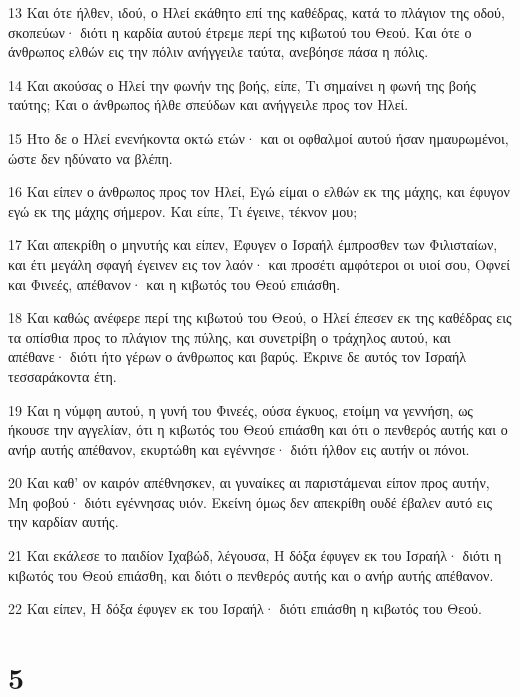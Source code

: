 \par 13 Και ότε ήλθεν, ιδού, ο Ηλεί εκάθητο επί της καθέδρας, κατά το πλάγιον της οδού, σκοπεύων· διότι η καρδία αυτού έτρεμε περί της κιβωτού του Θεού. Και ότε ο άνθρωπος ελθών εις την πόλιν ανήγγειλε ταύτα, ανεβόησε πάσα η πόλις.
\par 14 Και ακούσας ο Ηλεί την φωνήν της βοής, είπε, Τι σημαίνει η φωνή της βοής ταύτης; Και ο άνθρωπος ήλθε σπεύδων και ανήγγειλε προς τον Ηλεί.
\par 15 Ήτο δε ο Ηλεί ενενήκοντα οκτώ ετών· και οι οφθαλμοί αυτού ήσαν ημαυρωμένοι, ώστε δεν ηδύνατο να βλέπη.
\par 16 Και είπεν ο άνθρωπος προς τον Ηλεί, Εγώ είμαι ο ελθών εκ της μάχης, και έφυγον εγώ εκ της μάχης σήμερον. Και είπε, Τι έγεινε, τέκνον μου;
\par 17 Και απεκρίθη ο μηνυτής και είπεν, Έφυγεν ο Ισραήλ έμπροσθεν των Φιλισταίων, και έτι μεγάλη σφαγή έγεινεν εις τον λαόν· και προσέτι αμφότεροι οι υιοί σου, Οφνεί και Φινεές, απέθανον· και η κιβωτός του Θεού επιάσθη.
\par 18 Και καθώς ανέφερε περί της κιβωτού του Θεού, ο Ηλεί έπεσεν εκ της καθέδρας εις τα οπίσθια προς το πλάγιον της πύλης, και συνετρίβη ο τράχηλος αυτού, και απέθανε· διότι ήτο γέρων ο άνθρωπος και βαρύς. Έκρινε δε αυτός τον Ισραήλ τεσσαράκοντα έτη.
\par 19 Και η νύμφη αυτού, η γυνή του Φινεές, ούσα έγκυος, ετοίμη να γεννήση, ως ήκουσε την αγγελίαν, ότι η κιβωτός του Θεού επιάσθη και ότι ο πενθερός αυτής και ο ανήρ αυτής απέθανον, εκυρτώθη και εγέννησε· διότι ήλθον εις αυτήν οι πόνοι.
\par 20 Και καθ' ον καιρόν απέθνησκεν, αι γυναίκες αι παριστάμεναι είπον προς αυτήν, Μη φοβού· διότι εγέννησας υιόν. Εκείνη όμως δεν απεκρίθη ουδέ έβαλεν αυτό εις την καρδίαν αυτής.
\par 21 Και εκάλεσε το παιδίον Ιχαβώδ, λέγουσα, Η δόξα έφυγεν εκ του Ισραήλ· διότι η κιβωτός του Θεού επιάσθη, και διότι ο πενθερός αυτής και ο ανήρ αυτής απέθανον.
\par 22 Και είπεν, Η δόξα έφυγεν εκ του Ισραήλ· διότι επιάσθη η κιβωτός του Θεού.

\chapter{5}

